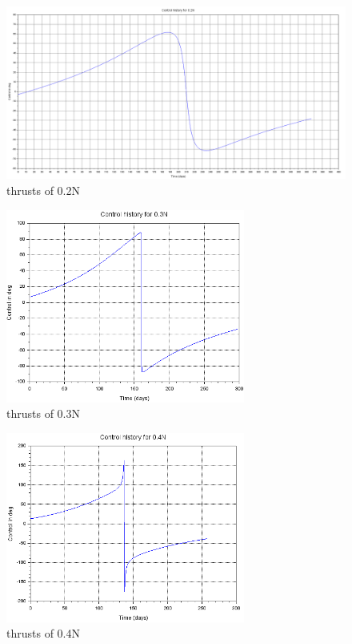 \documentclass{article}
\begin{document}
	\begin{figure}[htbp]
		\centering
		\includegraphics[width=\textwidth]{figure1.png}
		\caption{thrusts of 0.2N}
		\label{fig:0.2}
	\end{figure}
	
	\begin{figure}[htbp]
		\centering
		\includegraphics[width=0.7\textwidth]{figure2.png}
		\caption{thrusts of 0.3N}
		\label{fig:0.3}
	\end{figure}
	
	\begin{figure}[htbp]
		\centering
		\includegraphics[width=0.7\textwidth]{figure3.png}
		\caption{thrusts of 0.4N}
		\label{fig:0.4}
	\end{figure}
	
\end{document}
